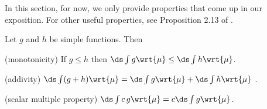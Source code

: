 \documentclass{article} %
\begin{document}


%
%	
%


In this section, for now, we only provide properties that come up in our exposition.  For other useful properties, see Proposition 2.13 of \cite{folland1999real}.


\begin{proposition} 
Let $g$ and $h$  be simple functions.  Then 
\begin{alphabate}
\item (monotonicity) If $g \leq h$ then $\ds\int g \wrt{\mu} \leq \ds\int h \wrt{\mu}$.
\item (addivity) $\ds\int (g + h) \wrt{\mu} = \ds\int g \wrt{\mu} + \ds\int h \wrt{\mu}$ .
\item (scalar multiple property) $\ds\int c \, g \wrt{\mu} = c \ds\int g \wrt{\mu}$.
\end{alphabate}
\label{prop:properties_of_integrals_of_simple_functions}
\end{proposition}
\end{document}
